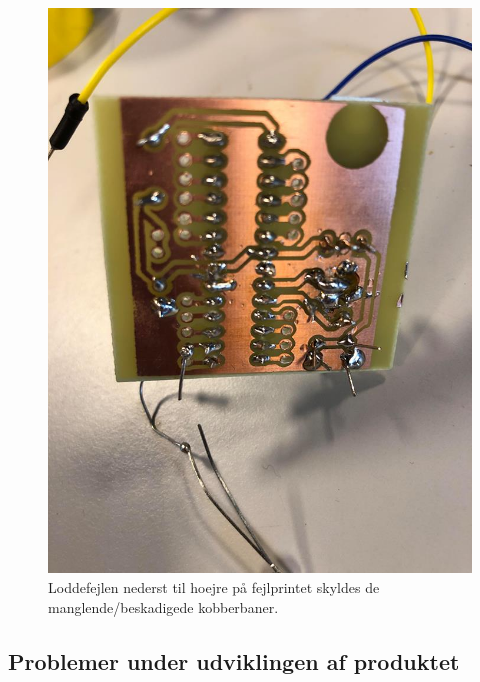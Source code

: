 \begin{figure}[H]
\centering
\includegraphics[scale=0.4]{Billeder/fejlprint.jpg}
\caption{ Loddefejlen nederst til hoejre på fejlprintet skyldes de manglende/beskadigede kobberbaner.}
\label{fig:print_test}
\end{figure}




\subsection{Problemer under udviklingen af produktet }
